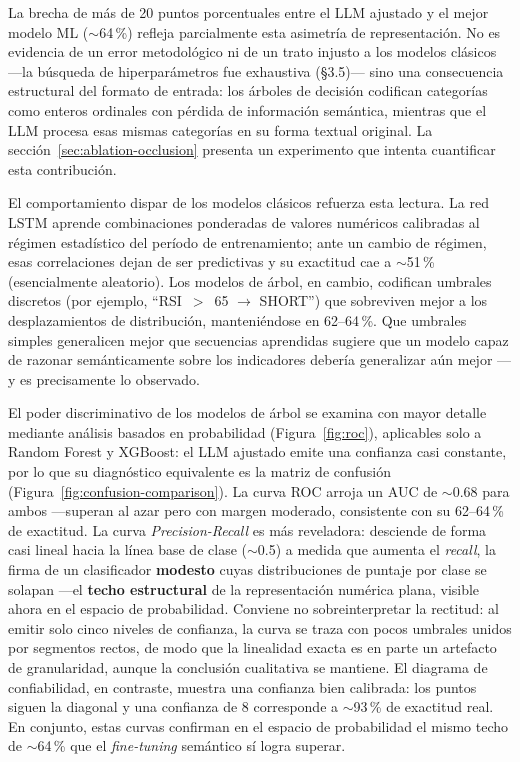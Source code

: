 \documentclass[10pt,twocolumn]{article}
\begin{document}
La brecha de m\'as de 20 puntos porcentuales entre el LLM ajustado y el mejor modelo ML ($\sim$64\,\%) refleja parcialmente esta asimetr\'ia de representaci\'on. No es evidencia de un error metodol\'ogico ni de un trato injusto a los modelos cl\'asicos ---la b\'usqueda de hiperpar\'ametros fue exhaustiva (\S3.5)--- sino una consecuencia estructural del formato de entrada: los \'arboles de decisi\'on codifican categor\'ias como enteros ordinales con p\'erdida de informaci\'on sem\'antica, mientras que el LLM procesa esas mismas categor\'ias en su forma textual original. La secci\'on~\ref{sec:ablation-occlusion} presenta un experimento que intenta cuantificar esta contribuci\'on.

El comportamiento dispar de los modelos cl\'asicos refuerza esta lectura. La red LSTM aprende combinaciones ponderadas de valores num\'ericos calibradas al r\'egimen estad\'istico del per\'iodo de entrenamiento; ante un cambio de r\'egimen, esas correlaciones dejan de ser predictivas y su exactitud cae a $\sim$51\,\% (esencialmente aleatorio). Los modelos de \'arbol, en cambio, codifican umbrales discretos (por ejemplo, ``RSI~$>$~65 $\rightarrow$ SHORT'') que sobreviven mejor a los desplazamientos de distribuci\'on, manteni\'endose en 62--64\,\%. Que umbrales simples generalicen mejor que secuencias aprendidas sugiere que un modelo capaz de razonar sem\'anticamente sobre los indicadores deber\'ia generalizar a\'un mejor ---y es precisamente lo observado.

El poder discriminativo de los modelos de \'arbol se examina con mayor detalle mediante an\'alisis basados en probabilidad (Figura~\ref{fig:roc}), aplicables solo a Random Forest y XGBoost: el LLM ajustado emite una confianza casi constante, por lo que su diagn\'ostico equivalente es la matriz de confusi\'on (Figura~\ref{fig:confusion-comparison}). La curva ROC arroja un AUC de $\sim$0.68 para ambos ---superan al azar pero con margen moderado, consistente con su 62--64\,\% de exactitud. La curva \textit{Precision-Recall} es m\'as reveladora: desciende de forma casi lineal hacia la l\'inea base de clase ($\sim$0.5) a medida que aumenta el \textit{recall}, la firma de un clasificador \textbf{modesto} cuyas distribuciones de puntaje por clase se solapan ---el \textbf{techo estructural} de la representaci\'on num\'erica plana, visible ahora en el espacio de probabilidad. Conviene no sobreinterpretar la rectitud: al emitir solo cinco niveles de confianza, la curva se traza con pocos umbrales unidos por segmentos rectos, de modo que la linealidad exacta es en parte un artefacto de granularidad, aunque la conclusi\'on cualitativa se mantiene. El diagrama de confiabilidad, en contraste, muestra una confianza bien calibrada: los puntos siguen la diagonal y una confianza de 8 corresponde a $\sim$93\,\% de exactitud real. En conjunto, estas curvas confirman en el espacio de probabilidad el mismo techo de $\sim$64\,\% que el \textit{fine-tuning} sem\'antico s\'i logra superar.
\end{document}
